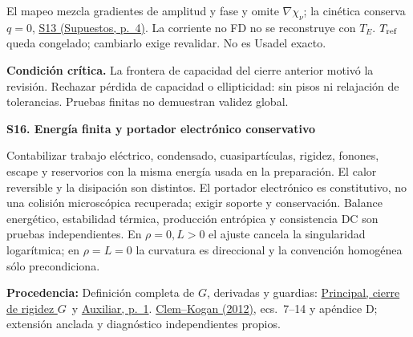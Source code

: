 \documentclass[11pt,a4paper]{article}
\newcommand{\critical}[1]{\par{\small\raggedright\textbf{\color{accent}Condición crítica.} #1\par}}
\newcommand{\origin}[1]{\par{\footnotesize\raggedright\color{ink}\textbf{Procedencia:} #1\par}}
\newcommand{\sref}[2]{\href{Supuestos.pdf\#nameddest=#1}{#1 (Supuestos, p.~#2)}}
\newcommand{\principalg}{\href{Principal.pdf\#nameddest=G-final}{Principal, cierre de rigidez $G$}}
\newcommand{\assumption}[2]{\par\vspace{6pt}\hypertarget{#1}{\textbf{\color{ink}#1. #2}}\par}
\newcommand{\smallnote}[1]{{\small #1\par}}
\begin{document}
\smallnote{El mapeo mezcla gradientes de amplitud y fase y omite \(\nabla\chi_\nu\); la cinética conserva \(q=0\), \sref{S13}{4}. La corriente no FD no se reconstruye con \(T_E\). \(T_{\rm ref}\) queda congelado; cambiarlo exige revalidar. No es Usadel exacto.}
\critical{La frontera de capacidad del cierre anterior motivó la revisión. Rechazar pérdida de capacidad o ellipticidad: sin pisos ni relajación de tolerancias. Pruebas finitas no demuestran validez global.}
\assumption{S16}{Energía finita y portador electrónico conservativo}
\smallnote{Contabilizar trabajo eléctrico, condensado, cuasipartículas, rigidez, fonones, escape y reservorios con la misma energía usada en la preparación. El calor reversible y la disipación son distintos. El portador electrónico es constitutivo, no una colisión microscópica recuperada; exigir soporte y conservación. Balance energético, estabilidad térmica, producción entrópica y consistencia DC son pruebas independientes. En \(\rho=0,L>0\) el ajuste cancela la singularidad logarítmica; en \(\rho=L=0\) la curvatura es direccional y la convención homogénea sólo precondiciona.}
\vfill
\origin{Definición completa de $G$, derivadas y guardias: \principalg\ y \href{Auxiliar.pdf\#nameddest=G-final}{Auxiliar, p.~1}. \href{https://arxiv.org/html/1207.6421}{Clem--Kogan (2012)}, ecs.~7--14 y apéndice D; extensión anclada y diagnóstico independientes propios.}
\newpage
\end{document}
